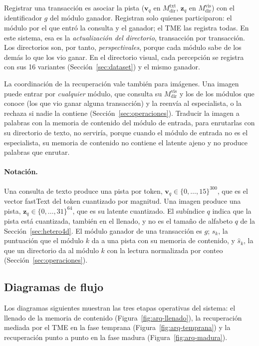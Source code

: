 Registrar una transacción es asociar la pista ($\mathbf{v}_q$ en
$M^{\mathrm{txt}}_{\mathrm{dir}}$, $\mathbf{z}_q$ en $M^{\mathrm{vis}}_{\mathrm{dir}}$)
con el identificador $g$ del módulo ganador.
Registran solo quienes participaron: el módulo por el que entró la consulta y el
ganador; el TME las registra todas.
En este sistema, esa es la \emph{actualización del directorio}, transacción por
transacción.
Los directorios son, por tanto, \emph{perspectivales}, porque cada módulo sabe de los demás lo
que los vio ganar.
En el directorio visual, cada percepción se registra con sus 16 variantes
(Sección~\ref{sec:dataset}) y el mismo ganador.

La coordinación de la recuperación vale también para imágenes.
Una imagen puede entrar por \emph{cualquier} módulo, que consulta su
$M^{\mathrm{vis}}_{\mathrm{dir}}$ y los de los módulos que conoce (los que vio ganar
alguna transacción) y la reenvía al especialista, o la rechaza si nadie la contiene
(Sección~\ref{sec:operaciones}).
Traducir la imagen a palabras con la memoria de contenido del módulo de entrada, para
enrutarlas con su directorio de texto, no serviría, porque cuando el módulo de entrada
no es el especialista, su memoria de contenido no contiene el latente ajeno y no produce
palabras que enrutar.

\paragraph{Notación.}
Una consulta de texto produce una pista por token, $\mathbf{v}_q \in
\{0,\ldots,15\}^{300}$, que es el vector fastText del token cuantizado por magnitud.
Una imagen produce una pista, $\mathbf{z}_q \in \{0,\ldots,31\}^{64}$, que es su latente
cuantizado.
El subíndice $q$ indica que la pista está cuantizada, también en el llenado, y no es el
tamaño de alfabeto $q$ de la Sección~\ref{sec:hetero4d}.
El módulo ganador de una transacción es $g$; $s_k$, la puntuación que el módulo $k$ da
a una pista con su memoria de contenido, y $\hat{s}_k$, la que un directorio da al
módulo $k$ con la lectura normalizada por conteo (Sección~\ref{sec:operaciones}).

\subsection{Diagramas de flujo}
\label{sec:diagramas}

Los diagramas siguientes muestran las tres etapas operativas del sistema: el
llenado de la memoria de contenido (Figura~\ref{fig:arq-llenado}), la recuperación
mediada por el TME en la fase temprana (Figura~\ref{fig:arq-temprana}) y la
recuperación punto a punto en la fase madura (Figura~\ref{fig:arq-madura}).

